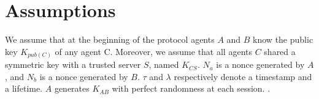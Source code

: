 \section{Assumptions}


We assume that at the beginning of the protocol agents $A$ and $B$ know the public key $K_{pub(C)}$ of any agent C.
Moreover, we assume that all agents $C$ shared a symmetric key with a trusted server $S$, named $K_{CS}$. $N_a$
is a nonce generated by $A$, and $N_b$ is a nonce generated by $B$. $\tau$ and $\lambda$ respectively denote a timestamp
and a lifetime. $A$ generates $K_{AB}$ with perfect randomness at each session.
.


